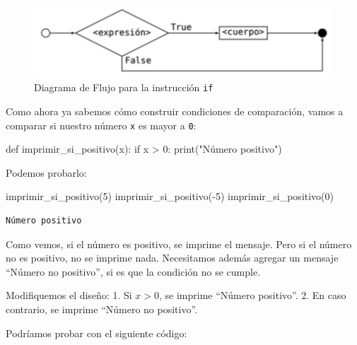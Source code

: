 \documentclass[
  letterpaper,
  DIV=11,
  numbers=noendperiod]{scrreprt}
\newenvironment{Shaded}{\begin{snugshade}}{\end{snugshade}}
\newcommand{\BuiltInTok}[1]{\textcolor[rgb]{0.00,0.23,0.31}{#1}}
\newcommand{\ControlFlowTok}[1]{\textcolor[rgb]{0.00,0.23,0.31}{#1}}
\newcommand{\DecValTok}[1]{\textcolor[rgb]{0.68,0.00,0.00}{#1}}
\newcommand{\KeywordTok}[1]{\textcolor[rgb]{0.00,0.23,0.31}{#1}}
\newcommand{\NormalTok}[1]{\textcolor[rgb]{0.00,0.23,0.31}{#1}}
\newcommand{\OperatorTok}[1]{\textcolor[rgb]{0.37,0.37,0.37}{#1}}
\newcommand{\StringTok}[1]{\textcolor[rgb]{0.13,0.47,0.30}{#1}}
\begin{document}
\begin{figure}

{\centering \includegraphics{imgs/unidad_3/if.png}

}

\caption{Diagrama de Flujo para la instrucción \texttt{if}}

\end{figure}

Como ahora ya sabemos cómo construir condiciones de comparación, vamos a
comparar si nuestro número \texttt{x} es mayor a \texttt{0}:

\begin{Shaded}
\begin{Highlighting}[]
\KeywordTok{def}\NormalTok{ imprimir\_si\_positivo(x):}
  \ControlFlowTok{if}\NormalTok{ x }\OperatorTok{\textgreater{}} \DecValTok{0}\NormalTok{:}
      \BuiltInTok{print}\NormalTok{(}\StringTok{"Número positivo"}\NormalTok{)}
\end{Highlighting}
\end{Shaded}

Podemos probarlo:

\begin{Shaded}
\begin{Highlighting}[]
\NormalTok{imprimir\_si\_positivo(}\DecValTok{5}\NormalTok{)}
\NormalTok{imprimir\_si\_positivo(}\OperatorTok{{-}}\DecValTok{5}\NormalTok{)}
\NormalTok{imprimir\_si\_positivo(}\DecValTok{0}\NormalTok{)}
\end{Highlighting}
\end{Shaded}

\begin{verbatim}
Número positivo
\end{verbatim}

Como vemos, si el número es positivo, se imprime el mensaje. Pero si el
número no es positivo, no se imprime nada. Necesitamos además agregar un
mensaje ``Número no positivo'', si es que la condición no se cumple.

Modifiquemos el diseño: 1. Si \(x>0\), se imprime ``Número positivo''.
2. En caso contrario, se imprime ``Número no positivo''.

Podríamos probar con el siguiente código:
\end{document}
